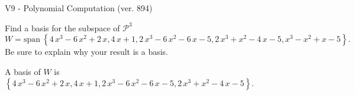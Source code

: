 \begin{exercise}
  \begin{exerciseTitle}V9 - Polynomial Computation (ver. 894)\end{exerciseTitle}
  \begin{exerciseStatement}
    Find a basis for the subspace of \(\mathcal{P}^3\) 
\[W=\mathrm{span}\ \left\{4 \, x^{3} - 6 \, x^{2} + 2 \, x , 4 \, x + 1 , 2 \, x^{3} - 6 \, x^{2} - 6 \, x - 5 , 2 \, x^{3} + x^{2} - 4 \, x - 5 , x^{3} - x^{2} + x - 5\right\}.\]
 Be sure to explain why your result is a basis.


  \end{exerciseStatement}
  \begin{exerciseAnswer}
   A basis of \(W\) is  \(\left\{4 \, x^{3} - 6 \, x^{2} + 2 \, x , 4 \, x + 1 , 2 \, x^{3} - 6 \, x^{2} - 6 \, x - 5 , 2 \, x^{3} + x^{2} - 4 \, x - 5\right\}\).
  


  \end{exerciseAnswer}
\end{exercise}